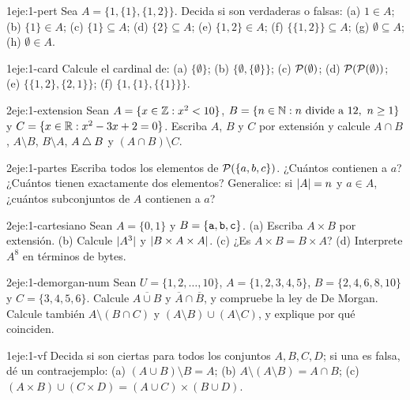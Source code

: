 \begin{ejercicio}{1}{eje:1-pert}
Sea $A=\{1,\{1\},\{1,2\}\}$. Decida si son verdaderas o falsas: (a) $1\in A$; (b) $\{1\}\in A$; (c) $\{1\}\subseteq A$; (d) $\{2\}\subseteq A$; (e) $\{1,2\}\in A$; (f) $\{\{1,2\}\}\subseteq A$; (g) $\emptyset\subseteq A$; (h) $\emptyset\in A$.
\end{ejercicio}

\begin{ejercicio}{1}{eje:1-card}
Calcule el cardinal de: (a) $\{\emptyset\}$; (b) $\{\emptyset,\{\emptyset\}\}$; (c) $\mathcal{P}(\emptyset)$; (d) $\mathcal{P}(\mathcal{P}(\emptyset))$; (e) $\{\{1,2\},\{2,1\}\}$; (f) $\{1,\{1\},\{\{1\}\}\}$.
\end{ejercicio}

\begin{ejercicio}{2}{eje:1-extension}
Sean $A=\{x\in\mathbb{Z} : x^{2}<10\}$, $B=\{n\in\N : n\ \text{divide a}\ 12,\ n\ge1\}$ y $C=\{x\in\mathbb{R} : x^{2}-3x+2=0\}$. Escriba $A$, $B$ y $C$ por extensión y calcule $A\cap B$, $A\setminus B$, $B\setminus A$, $A\mathbin{\triangle} B$ y $(A\cap B)\setminus C$.
\end{ejercicio}

\begin{ejercicio}{2}{eje:1-partes}
Escriba todos los elementos de $\mathcal{P}(\{a,b,c\})$. ¿Cuántos contienen a $a$? ¿Cuántos tienen exactamente dos elementos? Generalice: si $\lvert A\rvert=n$ y $a\in A$, ¿cuántos subconjuntos de $A$ contienen a $a$?
\end{ejercicio}

\begin{ejercicio}{2}{eje:1-cartesiano}
Sean $A=\{0,1\}$ y $B=\{\texttt{a},\texttt{b},\texttt{c}\}$. (a) Escriba $A\times B$ por extensión. (b) Calcule $\lvert A^{3}\rvert$ y $\lvert B\times A\times A\rvert$. (c) ¿Es $A\times B=B\times A$? (d) Interprete $A^{8}$ en términos de bytes.
\end{ejercicio}

\begin{ejercicio}{2}{eje:1-demorgan-num}
Sean $U=\{1,2,\dots,10\}$, $A=\{1,2,3,4,5\}$, $B=\{2,4,6,8,10\}$ y $C=\{3,4,5,6\}$. Calcule $\overline{A\cup B}$ y $\overline{A}\cap\overline{B}$, y compruebe la ley de De Morgan. Calcule también $A\setminus(B\cap C)$ y $(A\setminus B)\cup(A\setminus C)$, y explique por qué coinciden.
\end{ejercicio}

\begin{ejercicio}{1}{eje:1-vf}
Decida si son ciertas para todos los conjuntos $A,B,C,D$; si una es falsa, dé un contraejemplo: (a) $(A\cup B)\setminus B=A$; (b) $A\setminus(A\setminus B)=A\cap B$; (c) $(A\times B)\cup(C\times D)=(A\cup C)\times(B\cup D)$.
\end{ejercicio}

